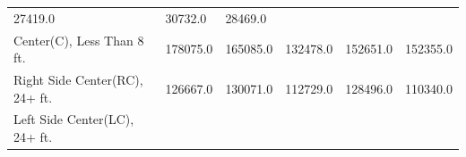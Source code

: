 \documentclass[]{article}
\begin{document}
\begin{longtable}[]{@{}llllll@{}}
\begin{minipage}[t]{0.10\columnwidth}
27419.0\strut
\end{minipage} & \begin{minipage}[t]{0.12\columnwidth}\raggedright
30732.0\strut
\end{minipage} & \begin{minipage}[t]{0.12\columnwidth}\raggedright
28469.0\strut
\end{minipage}\tabularnewline
\begin{minipage}[t]{0.25\columnwidth}\raggedright
Center(C), Less Than 8 ft.\strut
\end{minipage} & \begin{minipage}[t]{0.12\columnwidth}\raggedright
178075.0\strut
\end{minipage} & \begin{minipage}[t]{0.12\columnwidth}\raggedright
165085.0\strut
\end{minipage} & \begin{minipage}[t]{0.10\columnwidth}\raggedright
132478.0\strut
\end{minipage} & \begin{minipage}[t]{0.12\columnwidth}\raggedright
152651.0\strut
\end{minipage} & \begin{minipage}[t]{0.12\columnwidth}\raggedright
152355.0\strut
\end{minipage}\tabularnewline
\begin{minipage}[t]{0.25\columnwidth}\raggedright
Right Side Center(RC), 24+ ft.\strut
\end{minipage} & \begin{minipage}[t]{0.12\columnwidth}\raggedright
126667.0\strut
\end{minipage} & \begin{minipage}[t]{0.12\columnwidth}\raggedright
130071.0\strut
\end{minipage} & \begin{minipage}[t]{0.10\columnwidth}\raggedright
112729.0\strut
\end{minipage} & \begin{minipage}[t]{0.12\columnwidth}\raggedright
128496.0\strut
\end{minipage} & \begin{minipage}[t]{0.12\columnwidth}\raggedright
110340.0\strut
\end{minipage}\tabularnewline
\begin{minipage}[t]{0.25\columnwidth}\raggedright
Left Side Center(LC), 24+ ft.\strut
\end{minipage} & \begin{minipage}[t]{0.12\columnwidth}\raggedright

\end{minipage}
\end{longtable}
\end{document}

